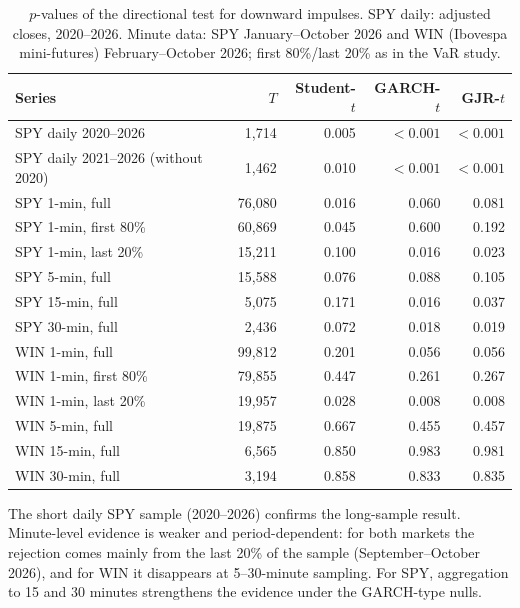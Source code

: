 \documentclass[11pt,a4paper]{article}
\theoremstyle{definition}
\theoremstyle{remark}
\begin{document}
\begin{table}[ht]\centering\footnotesize\setlength{\tabcolsep}{4pt}
\caption{$p$-values of the directional test for downward impulses. SPY daily: adjusted closes, 2020--2026. Minute data: SPY January--October 2026 and WIN (Ibovespa mini-futures) February--October 2026; first 80\%/last 20\% as in the VaR study.}\label{tab:data}
\begin{tabular}{lrrrr}
\toprule
Series & $T$ & Student-$t$ & GARCH-$t$ & GJR-$t$\\
\midrule
SPY daily 2020--2026 & 1{,}714 & 0.005 & $<0.001$ & $<0.001$\\
SPY daily 2021--2026 (without 2020) & 1{,}462 & 0.010 & $<0.001$ & $<0.001$\\
\addlinespace
SPY 1-min, full & 76{,}080 & 0.016 & 0.060 & 0.081\\
SPY 1-min, first 80\% & 60{,}869 & 0.045 & 0.600 & 0.192\\
SPY 1-min, last 20\% & 15{,}211 & 0.100 & 0.016 & 0.023\\
SPY 5-min, full & 15{,}588 & 0.076 & 0.088 & 0.105\\
SPY 15-min, full & 5{,}075 & 0.171 & 0.016 & 0.037\\
SPY 30-min, full & 2{,}436 & 0.072 & 0.018 & 0.019\\
\addlinespace
WIN 1-min, full & 99{,}812 & 0.201 & 0.056 & 0.056\\
WIN 1-min, first 80\% & 79{,}855 & 0.447 & 0.261 & 0.267\\
WIN 1-min, last 20\% & 19{,}957 & 0.028 & 0.008 & 0.008\\
WIN 5-min, full & 19{,}875 & 0.667 & 0.455 & 0.457\\
WIN 15-min, full & 6{,}565 & 0.850 & 0.983 & 0.981\\
WIN 30-min, full & 3{,}194 & 0.858 & 0.833 & 0.835\\
\bottomrule
\end{tabular}
\end{table}

The short daily SPY sample (2020--2026) confirms the long-sample result. Minute-level evidence is weaker and period-dependent: for both markets the rejection comes mainly from the last 20\% of the sample (September--October 2026), and for WIN it disappears at 5--30-minute sampling. For SPY, aggregation to 15 and 30 minutes strengthens the evidence under the GARCH-type nulls.
\end{document}

